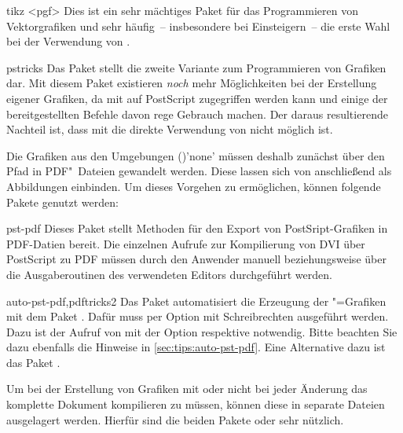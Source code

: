 \begin{packages}
\item[tikz]<pgf>
  Dies ist ein sehr mächtiges Paket für das Programmieren von Vektorgrafiken 
  und sehr häufig~-- insbesondere bei Einsteigern~-- die erste Wahl bei der 
  Verwendung von .
\item[pstricks]
  Das Paket  stellt die zweite Variante zum Programmieren 
  von Grafiken dar. Mit diesem Paket existieren \emph{noch} mehr Möglichkeiten 
  bei der Erstellung eigener Grafiken, da mit  auf PostScript 
  zugegriffen werden kann und einige der bereitgestellten Befehle davon rege 
  Gebrauch machen. Der daraus resultierende Nachteil ist, dass mit 
   die direkte Verwendung von  nicht 
  möglich ist.
  
  Die Grafiken aus den Umgebungen 
  ()'none' müssen deshalb zunächst
  über den Pfad 
  in PDF"~Dateien gewandelt werden. Diese lassen sich von  
  anschließend als Abbildungen einbinden. Um dieses Vorgehen zu ermöglichen, 
  können folgende Pakete genutzt werden:
  \begin{packages}
  \item[pst-pdf]
    Dieses Paket stellt Methoden für den Export von PostSript-Grafiken in 
    PDF-Datien bereit. Die einzelnen Aufrufe zur Kompilierung von DVI über 
    PostScript zu PDF müssen durch den Anwender manuell beziehungsweise über 
    die Ausgaberoutinen des verwendeten Editors durchgeführt werden.
  \item[auto-pst-pdf,pdftricks2]
    Das Paket automatisiert die Erzeugung der "=Grafiken mit 
    dem Paket . Dafür muss  per Option mit 
    Schreibrechten ausgeführt werden. Dazu ist der Aufruf von  
    mit der Option  respektive  
    notwendig. Bitte beachten Sie dazu ebenfalls die Hinweise in 
    \autoref{sec:tips:auto-pst-pdf}. Eine Alternative dazu ist das Paket 
    .
  \end{packages}
\end{packages}
%
Um bei der Erstellung von Grafiken mit  oder  
nicht bei jeder Änderung das komplette Dokument kompilieren zu müssen, können 
diese in separate Dateien ausgelagert werden. Hierfür sind die beiden Pakete 
 oder  sehr nützlich.

